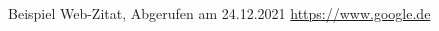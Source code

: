 \begin{thebibliography}{9}

Beispiel Web-Zitat, Abgerufen am 24.12.2021 \url{https://www.google.de}

\end{thebibliography}